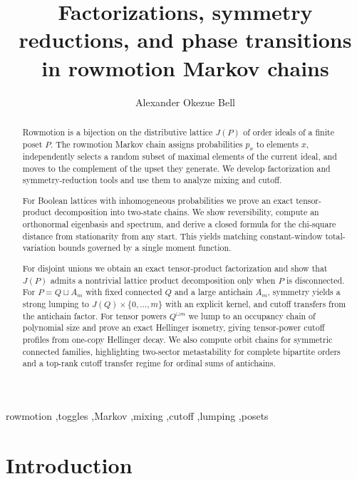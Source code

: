 \documentclass[final,3p,times]{elsarticle}
\theoremstyle{definition}
\begin{document}
\begin{frontmatter}

\title{Factorizations, symmetry reductions, and phase transitions in rowmotion Markov chains}

\author{Alexander Okezue Bell}
\address{Department of Mathematics, Stanford University, Stanford, CA, US}

\begin{abstract}
Rowmotion is a bijection on the distributive lattice $J(P)$ of order ideals of a finite poset $P$. The rowmotion Markov chain assigns probabilities $p_x$ to elements $x$, independently selects a random subset of maximal elements of the current ideal, and moves to the complement of the upset they generate. We develop factorization and symmetry-reduction tools and use them to analyze mixing and cutoff.

For Boolean lattices with inhomogeneous probabilities we prove an exact tensor-product decomposition into two-state chains. We show reversibility, compute an orthonormal eigenbasis and spectrum, and derive a closed formula for the chi-square distance from stationarity from any start. This yields matching constant-window total-variation bounds governed by a single moment function.

For disjoint unions we obtain an exact tensor-product factorization and show that $J(P)$ admits a nontrivial lattice product decomposition only when $P$ is disconnected. For $P=Q\sqcup A_m$ with fixed connected $Q$ and a large antichain $A_m$, symmetry yields a strong lumping to $J(Q)\times\{0,\dots,m\}$ with an explicit kernel, and cutoff transfers from the antichain factor. For tensor powers $Q^{\sqcup m}$ we lump to an occupancy chain of polynomial size and prove an exact Hellinger isometry, giving tensor-power cutoff profiles from one-copy Hellinger decay. We also compute orbit chains for symmetric connected families, highlighting two-sector metastability for complete bipartite orders and a top-rank cutoff transfer regime for ordinal sums of antichains.
\end{abstract}

\begin{keyword}
rowmotion \sep toggles \sep Markov \sep mixing \sep cutoff \sep lumping \sep posets
\end{keyword}

\end{frontmatter}

\section{Introduction}
\end{document}
